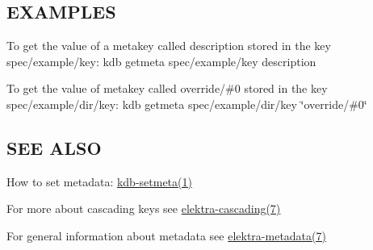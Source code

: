 \subsection*{E\+X\+A\+M\+P\+L\+E\+S}

To get the value of a metakey called {\ttfamily description} stored in the key {\ttfamily spec/example/key}\+: {\ttfamily kdb getmeta spec/example/key description}

To get the value of metakey called {\ttfamily override/\#0} stored in the key {\ttfamily spec/example/dir/key}\+: {\ttfamily kdb getmeta spec/example/dir/key \char`\"{}override/\#0\char`\"{}}

\subsection*{S\+E\+E A\+L\+S\+O}


\begin{DoxyItemize}
\item How to set metadata\+: \hyperlink{md_doc_help_kdb-setmeta_doc_help_kdb-setmeta_md}{kdb-\/setmeta(1)}
\item For more about cascading keys see \hyperlink{md_doc_help_elektra-cascading_doc_help_elektra-cascading_md}{elektra-\/cascading(7)}
\item For general information about metadata see \hyperlink{md_doc_help_elektra-metadata_doc_help_elektra-metadata_md}{elektra-\/metadata(7)} 
\end{DoxyItemize}